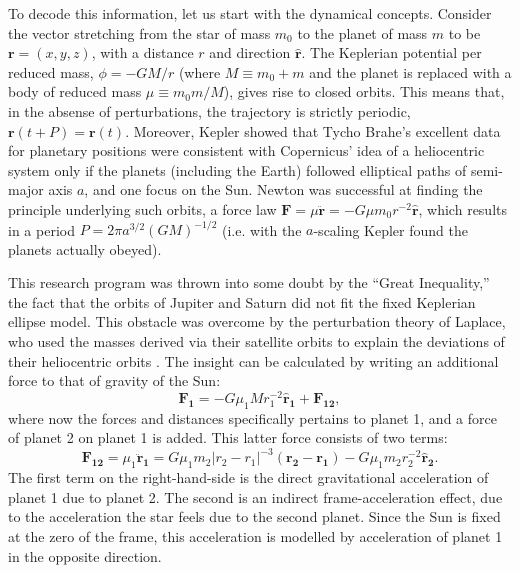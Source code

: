 \documentclass[graybox,natbib,nosecnum]{svmult}
\begin{document}
To decode this information, let us start with the dynamical concepts.  Consider the vector stretching from the star of mass $m_0$ to the planet of mass $m$ to be $\mathbf{r}=(x,y,z)$, with a distance $r$ and direction $\mathbf{\hat r}$.  The Keplerian potential per reduced mass, $\phi=-GM/r$ (where $M \equiv m_0 + m$ and the planet is replaced with a body of reduced mass $\mu \equiv m_0 m /M$), gives rise to closed orbits.  This means that, in the absense of perturbations, the trajectory is strictly periodic, $\mathbf{r}(t+P) = \mathbf{r}(t)$.  Moreover, Kepler showed that Tycho Brahe's excellent data for planetary positions were consistent with Copernicus' idea of a heliocentric system only if the planets (including the Earth) followed elliptical paths of semi-major axis $a$, and one focus on the Sun. Newton was successful at finding the principle underlying such orbits, a force law $\mathbf{F} = \mu \mathbf{\ddot r} =-G \mu m_0 r^{-2} \mathbf{\hat r}$, which results in a period $P = 2 \pi a^{3/2} (GM)^{-1/2}$ (i.e. with the $a$-scaling Kepler found the planets actually obeyed).

This research program was thrown into some doubt by the ``Great Inequality,'' the fact that the orbits of Jupiter and Saturn did not fit the fixed Keplerian ellipse model.  This obstacle was overcome by the perturbation theory of Laplace, who used the masses derived via their satellite orbits to explain the deviations of their heliocentric orbits \citep{1985Wilson}.  The insight can be calculated by writing an additional force to that of gravity of the Sun: 
\begin{equation}
\mathbf{F_{1}} = -G \mu_1 M r_{1}^{-2} \mathbf{\hat r_{1}} + \mathbf{F_{12}},
\end{equation}
where now the forces and distances specifically pertains to planet 1, and a force of planet 2 on planet 1 is added.  This latter force consists of two terms: 
\begin{equation}
\mathbf{F_{12}} = \mu_1 \mathbf{\ddot r_1} = G \mu_1 m_2 \vert r_{2}-r_{1}\vert^{-3} (\mathbf{r_{2}} - \mathbf{r_{1}}) - G \mu_1 m_2 r_{2}^{-2} \mathbf{\hat r_{2}}.
\end{equation}
The first term on the right-hand-side is the direct gravitational acceleration of planet 1 due to planet 2.  The second is an indirect frame-acceleration effect, due to the acceleration the star feels due to the second planet.  Since the Sun is fixed at the zero of the frame, this acceleration is modelled by acceleration of planet 1 in the opposite direction.
\end{document}
